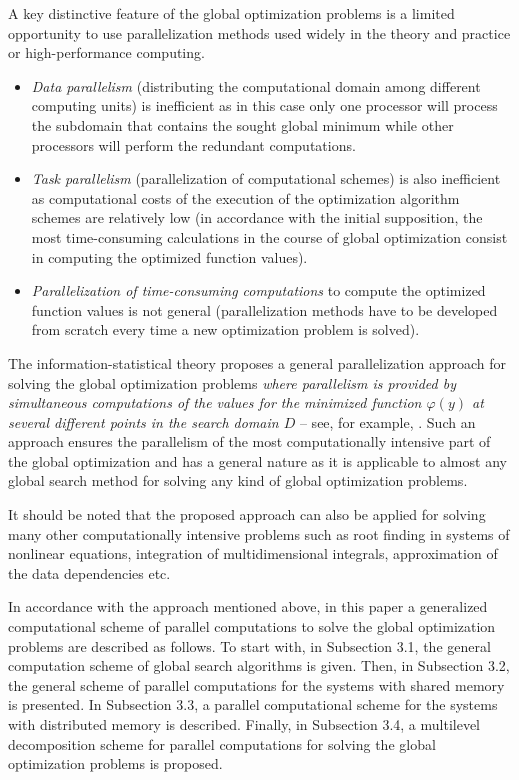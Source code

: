 \documentclass[
11pt,%
tightenlines,%
twoside,%
onecolumn,%
nofloats,%
nobibnotes,%
nofootinbib,%
superscriptaddress,%
noshowpacs,%
centertags]%
{revtex4}
\begin{document}
A key distinctive feature of the global optimization problems is a limited opportunity to use parallelization methods used widely in the theory and practice or high-performance computing.
\begin{itemize}
\item \textit{Data parallelism} (distributing the computational domain among different computing units) is inefficient as in this case only one processor will process the subdomain that contains the sought global minimum while other processors will perform the redundant computations.

\item \textit{Task parallelism} (parallelization of computational schemes) is also inefficient as computational costs of the execution of the optimization algorithm schemes are relatively low (in accordance with the initial supposition, the most time-consuming calculations in the course of global optimization consist in computing the optimized function values).

\item \textit{Parallelization of time-consuming computations} to compute the optimized function values is not general (parallelization methods have to be developed from scratch every time a new optimization problem is solved).
\end{itemize}

The information-statistical theory proposes a general parallelization approach for solving the global optimization problems \textit{where parallelism is provided by simultaneous computations of the values for the minimized function $\varphi(y)$ at several different points in the search domain $D$} -- see, for example, \cite{Strongin1, Strongin2, Strongin4}. Such an approach ensures the parallelism of the most computationally intensive part of the global optimization and has a general nature as it is applicable to almost any global search method for solving any kind of global optimization problems.

It should be noted that the proposed approach can also be applied for solving many other computationally intensive problems such as root finding in systems of nonlinear equations, integration of multidimensional integrals, approximation of the data dependencies etc.

In accordance with the approach mentioned above, in this paper a generalized computational scheme of parallel computations to solve the global optimization problems are described as follows. To start with, in Subsection 3.1, the general computation scheme of global search algorithms is given. Then, in Subsection 3.2, the general scheme of parallel computations for the systems with shared memory is presented. In Subsection 3.3, a parallel computational scheme for the systems with distributed memory is described. Finally, in Subsection 3.4, a multilevel decomposition scheme for parallel computations for solving the global optimization problems is proposed.
\end{document}
